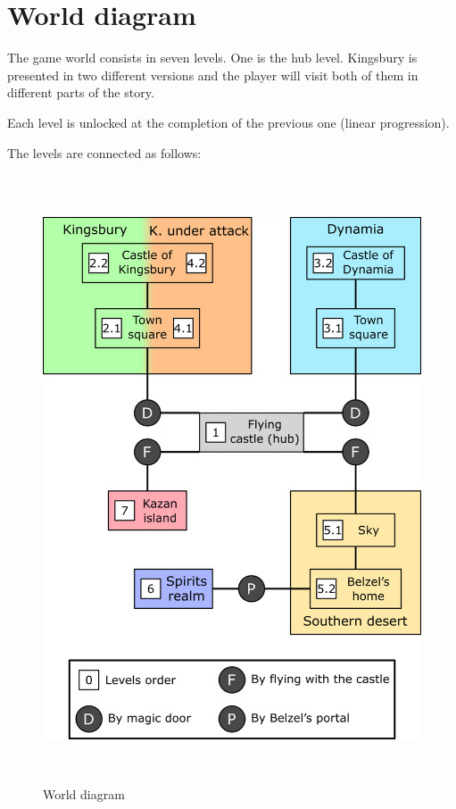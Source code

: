 \pagebreak %

\section{World diagram}

The game world consists in seven levels. One is the hub level. Kingsbury is presented in two different versions and the player will visit both of them in different parts of the story.

Each level is unlocked at the completion of the previous one (linear progression).

The levels are connected as follows:

\begin{figure}[H]
  \centering
  \includegraphics[height=18cm]{Images/Diagrams/worldDiagram}
  \caption{World diagram}
\end{figure}
